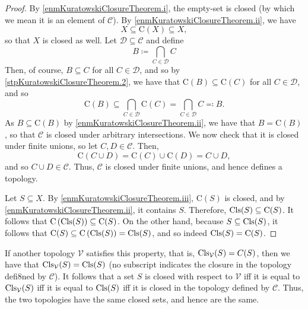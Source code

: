 \begin{thm}
\begin{proof}
By \ref{enmKuratowskiClosureTheorem.i}, the empty-set is closed (by which we mean it is an element of $\mathcal{C}$).  By \ref{enmKuratowskiClosureTheorem.ii}, we have
\begin{equation}
X\subseteq \mathrm{C}(X)\subseteq X,
\end{equation}
so that $X$ is closed as well.  Let $\mathcal{D}\subseteq \mathcal{C}$ and define
\begin{equation}
B\coloneqq \bigcap _{C\in \mathcal{D}}C
\end{equation}
Then, of course, $B\subseteq C$ for all $C\in \mathcal{D}$, and so by \cref{stpKuratowskiClosureTheorem.2}, we have that $\mathrm{C}(B)\subseteq \mathrm{C}(C)$ for all $C\in \mathcal{D}$, and so
\begin{equation}
\mathrm{C}(B)\subseteq \bigcap _{C\in \mathcal{D}}\mathrm{C}(C)=\bigcap _{C\in \mathcal{D}}C\eqqcolon B.
\end{equation}
As $B\subseteq \mathrm{C}(B)$ by \ref{enmKuratowskiClosureTheorem.ii}, we have that $B=\mathrm{C}(B)$, so that $\mathcal{C}$ is closed under arbitrary intersections.  We now check that it is closed under finite unions, so let $C,D\in \mathcal{C}$.  Then,
\begin{equation}
\mathrm{C}(C\cup D)=\mathrm{C}(C)\cup \mathrm{C}(D)=C\cup  D,
\end{equation}
and so $C\cup D\in \mathcal{C}$.  Thus, $\mathcal{C}$ is closed under finite unions, and hence defines a topology.

Let $S\subseteq  X$.  By \ref{enmKuratowskiClosureTheorem.iii}, $\mathrm{C}(S)$ is closed, and by \ref{enmKuratowskiClosureTheorem.ii}, it contains $S$.  Therefore, $\operatorname{Cls} (S)\subseteq \mathrm{C}(S)$.  It follows that $\mathrm{C}\left( \operatorname{Cls} (S)\right) \subseteq \mathrm{C}(S)$.  On the other hand, because $S\subseteq \operatorname{Cls} (S)$, it follows that $\mathrm{C}(S)\subseteq \mathrm{C}\left( \operatorname{Cls} (S)\right) =\operatorname{Cls} (S)$, and so indeed $\operatorname{Cls} (S)=\mathrm{C}(S)$.
\end{proof}

If another topology $\mathcal{V}$ satisfies this property, that is, $\operatorname{Cls} _{\mathcal{V}}(S)=C(S)$, then we have that $\operatorname{Cls} _{\mathcal{V}}(S)=\operatorname{Cls} (S)$ (no subscript indicates the closure in the topology defi8ned by $\mathcal{C}$).  It follows that a set $S$ is closed with respect to $\mathcal{V}$ iff it is equal to $\operatorname{Cls} _{\mathcal{V}}(S)$ iff it is equal to $\operatorname{Cls} (S)$ iff it is closed in the topology defined by $\mathcal{C}$.  Thus, the two topologies have the same closed sets, and hence are the same.
\end{thm}

